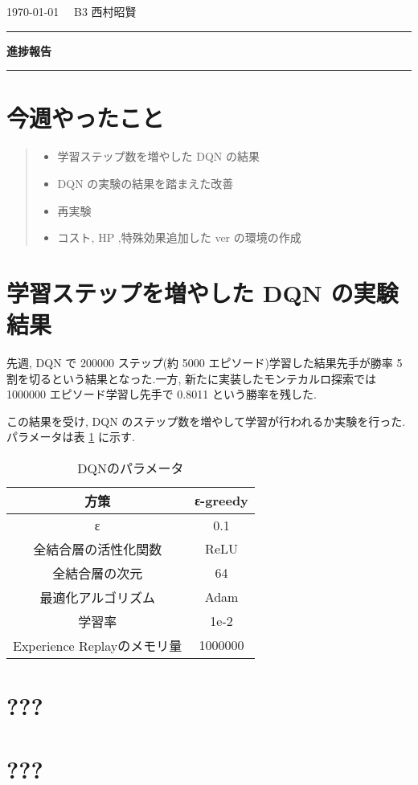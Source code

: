 \documentclass{jarticle}     %
\begin{document}
  \noindent
  \onecolumn
  \hspace{1em}

  \today
  \hfill
  \ \ B3 西村昭賢 

  \vspace{2mm}
  \hrule
  \begin{center}
  {\Large \bf 進捗報告}
  \end{center}
  \hrule
  \vspace{3mm}


\section{今週やったこと}
\begin{quote}
  \begin{itemize}
   \item 学習ステップ数を増やした DQN の結果
   \item DQN の実験の結果を踏まえた改善
   \item 再実験
   \item コスト, HP ,特殊効果追加した ver の環境の作成
  \end{itemize}
 \end{quote}


\section{学習ステップを増やした DQN の実験結果}
先週, DQN で 200000 ステップ(約 5000 エピソード)学習した結果先手が勝率 5 割を切るという結果となった.一方, 新たに実装したモンテカルロ探索では 1000000 エピソード学習し先手で 0.8011 という勝率を残した.\par
この結果を受け, DQN のステップ数を増やして学習が行われるか実験を行った.パラメータは表 \ref{table:param} に示す.
\begin{table}[h]
  \centering
  \caption{DQNのパラメータ}
  \label{table:param}
  \begin{tabular}{|c||c|}
  \hline
  方策                 & ε-greedy \\ \hline
  ε                      & 0.1      \\ \hline
  全結合層の活性化関数             & ReLU     \\ \hline
  全結合層の次元                & 64       \\ \hline
  最適化アルゴリズム              & Adam     \\ \hline
  学習率                    & 1e-2     \\ \hline
  Experience Replayのメモリ量 & 1000000  \\ \hline
  \end{tabular}
  \end{table}

\section{???}


\section{???}




\end{document}
